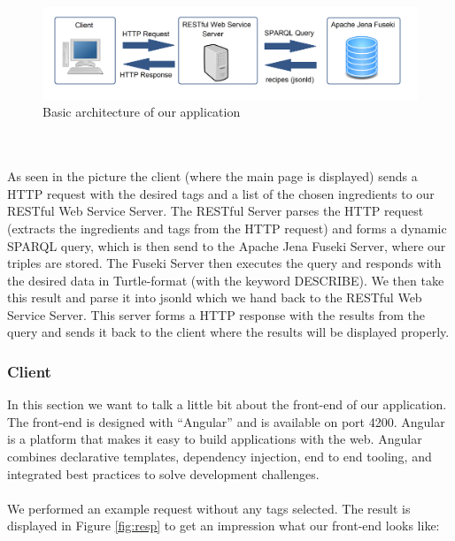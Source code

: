 \documentclass{article}
\begin{document}
\begin{figure}[H]
  \centering
  \includegraphics[width=12cm]{pictures/app.png}
  \caption{Basic architecture of our application}
  \label{fig:arch}
\end{figure}
\noindent
\\ \\
As seen in the picture the client (where the main page is displayed) sends a HTTP request with the desired tags and a list of the chosen ingredients to our RESTful Web Service Server. The RESTful Server parses the HTTP request (extracts the ingredients and tags from the HTTP request) and forms a dynamic SPARQL query, which is then send to the Apache Jena Fuseki Server, where our triples are stored. The Fuseki Server then executes the query and responds with the desired data in Turtle-format (with the keyword DESCRIBE). We then take this result and parse it into jsonld which we hand back to the RESTful Web Service Server. This server forms a HTTP response with the results from the query and sends it back to the client where the results will be displayed properly.

\subsubsection{Client}
In this section we want to talk a little bit about the front-end of our application. The front-end is designed with ``Angular'' and is available on port 4200. Angular is a platform that makes it easy to build applications with the web. Angular combines declarative templates, dependency injection, end to end tooling, and integrated best practices to solve development challenges.  \\ \\
We performed an example request without any tags selected. The result is displayed in Figure \ref{fig:resp} to get an impression what our front-end looks like:
\end{document}
